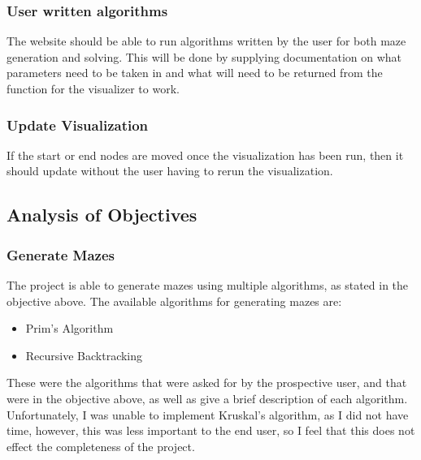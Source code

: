 \documentclass[titlepage]{article}
\begin{document}
\subsubsection{User written algorithms}
The website should be able to run algorithms written by the user for both maze generation and solving. This will be done by supplying documentation on what parameters need to be taken in and what will need to be returned from the function for the visualizer to work.

\subsubsection{Update Visualization}
If the start or end nodes are moved once the visualization has been run, then it should update without the user having to rerun the visualization.

\subsection{Analysis of Objectives}
\subsubsection{Generate Mazes}
The project is able to generate mazes using multiple algorithms, as stated in the objective above. The available algorithms for generating mazes are:
\begin{itemize}
    \item Prim's Algorithm
    \item Recursive Backtracking
\end{itemize}
These were the algorithms that were asked for by the prospective user, and that were in the objective above, as well as give a brief description of each algorithm. Unfortunately, I was unable to implement Kruskal's algorithm, as I did not have time, however, this was less important to the end user, so I feel that this does not effect the completeness of the project.
\end{document}
